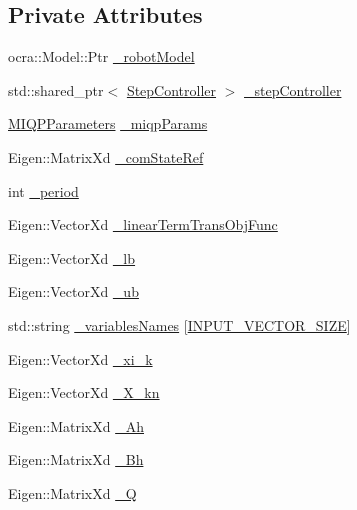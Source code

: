 \subsection*{\-Private \-Attributes}
\begin{DoxyCompactItemize}
\item 
ocra\-::\-Model\-::\-Ptr \hyperlink{classMIQPController_a03735ecec3242cdfc9bf8a443c561724}{\-\_\-robot\-Model}
\item 
std\-::shared\-\_\-ptr$<$ \hyperlink{classStepController}{\-Step\-Controller} $>$ \hyperlink{classMIQPController_a10018469a257136470ad9293fc3fe84a}{\-\_\-step\-Controller}
\item 
\hyperlink{structMIQPParameters}{\-M\-I\-Q\-P\-Parameters} \hyperlink{classMIQPController_a23f6caec48541df0ebe3f91189171ce5}{\-\_\-miqp\-Params}
\item 
\-Eigen\-::\-Matrix\-Xd \hyperlink{classMIQPController_ab74859a8dd208f3fc7608391d318d469}{\-\_\-com\-State\-Ref}
\item 
int \hyperlink{classMIQPController_aed2ce53008e32e64e107398d85e75170}{\-\_\-period}
\item 
\-Eigen\-::\-Vector\-Xd \hyperlink{classMIQPController_ac2ec0c5287589fe28f7381ebeaa5f4ef}{\-\_\-linear\-Term\-Trans\-Obj\-Func}
\item 
\-Eigen\-::\-Vector\-Xd \hyperlink{classMIQPController_ad3544c00f3515146c1818440905e36cc}{\-\_\-lb}
\item 
\-Eigen\-::\-Vector\-Xd \hyperlink{classMIQPController_aa8407451ad8b20c814b12fef631f43f6}{\-\_\-ub}
\item 
std\-::string \hyperlink{classMIQPController_a2c3ddd93fd843a3a4650314b47436be7}{\-\_\-variables\-Names} \mbox{[}\hyperlink{utils_8h_aa2f26540ce870ca91503bb6746a52e69}{\-I\-N\-P\-U\-T\-\_\-\-V\-E\-C\-T\-O\-R\-\_\-\-S\-I\-Z\-E}\mbox{]}
\item 
\-Eigen\-::\-Vector\-Xd \hyperlink{classMIQPController_ad1c63725dab2ce84382fcb0b071325ed}{\-\_\-xi\-\_\-k}
\item 
\-Eigen\-::\-Vector\-Xd \hyperlink{classMIQPController_a1fdfcba2c7b6422ac8d3b0b6095d7546}{\-\_\-\-X\-\_\-kn}
\item 
\-Eigen\-::\-Matrix\-Xd \hyperlink{classMIQPController_a388ed1c232c212e171276993b5cb3fec}{\-\_\-\-Ah}
\item 
\-Eigen\-::\-Matrix\-Xd \hyperlink{classMIQPController_a9a989875871a898f0ad19b441a2c67ba}{\-\_\-\-Bh}
\item 
\-Eigen\-::\-Matrix\-Xd \hyperlink{classMIQPController_ac6404f74d6002d6a0ca4bd2d0b41d548}{\-\_\-\-Q}

\end{DoxyCompactItemize}
